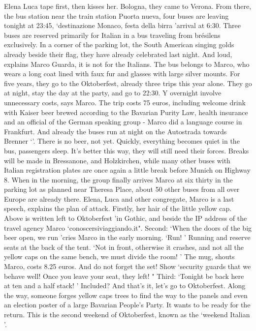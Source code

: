 Elena Luca tape first, then kisses her.
Bologna, they came to Verona.
From there, the bus station near the train station Puorta nueva, four buses are leaving tonight at 23:45, `destinazione Monaco, festa della birra 'arrival at 6:30.
Three buses are reserved primarily for Italian in a bus traveling from brésilens exclusively.
In a corner of the parking lot, the South American singing golds already beside their flag, they have already celebrated last night.
And loud, explains Marco Guarda, it is not for the Italians.
The bus belongs to Marco, who wears a long coat lined with faux fur and glasses with large silver mounts.
For five years, they go to the Oktoberfest, already three trips this year alone.
They go at night, stay the day at the party, and go to 22:30.
Y overnight involve unnecessary costs, says Marco.
The trip costs 75 euros, including welcome drink with Kaiser beer brewed according to the Bavarian Purity Law, health insurance and an official of the German speaking group - Marco did a language course in Frankfurt.
And already the buses run at night on the Autostrada towards Brenner `'.
There is no beer, not yet.
Quickly, everything becomes quiet in the bus, passengers sleep.
It's better this way, they will still need their forces.
Breaks will be made in Bressanone, and Holzkirchen, while many other buses with Italian registration plates are once again a little break before Munich on Highway 8.
When in the morning, the group finally arrives Marco at six thirty in the parking lot as planned near Theresa Place, about 50 other buses from all over Europe are already there.
Elena, Luca and other congregate, Marco is a last speech, explains the plan of attack.
Firstly, her hair of the little yellow cap.
Above is written left to Oktoberfest 'in Gothic, and beside the IP address of the travel agency Marco `conoscersiviaggiando.it".
Second: `When the doors of the big beer open, we run 'cries Marco in the early morning.
`Run! ' Running and reserve seats at the back of the tent.
`Not in front, otherwise it crashes, and not all the yellow caps on the same bench, we must divide the room! '
The mug, shouts Marco, costs 8.25 euros.
And do not forget the set!
Show `security guards that we behave well!
Once you leave your seat, they left! "
Third: `Tonight be back here at ten and a half stack! ' Included?
And that's it, let's go to Oktoberfest.
Along the way, someone forges yellow caps trees to find the way to the panels and even an election poster of a large Bavarian People's Party.
It wants to be ready for the return.
This is the second weekend of Oktoberfest, known as the `weekend Italian '.
